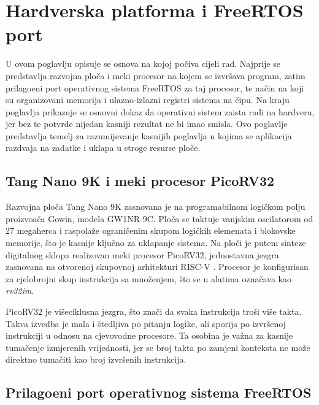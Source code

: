 \chapter{Hardverska platforma i FreeRTOS port}
\label{ch:platforma}

U ovom poglavlju opisuje se osnova na kojoj po\v{c}iva cijeli rad. Najprije se
predstavlja razvojna plo\v{c}a i meki procesor na kojem se izvr\v{s}ava program,
zatim prilago\dj{}eni port operativnog sistema FreeRTOS za taj procesor, te
na\v{c}in na koji su organizovani memorija i ulazno-izlazni registri sistema na
\v{c}ipu. Na kraju poglavlja prikazuje se osnovni dokaz da operativni sistem
zaista radi na hardveru, jer bez te potvrde nijedan kasniji rezultat ne bi imao
smisla. Ovo poglavlje predstavlja temelj za razumijevanje kasnijih poglavlja u
kojima se aplikacija razdvaja na zadatke i uklapa u stroge resurse plo\v{c}e.

\section{Tang Nano 9K i meki procesor PicoRV32}
\label{sec:platforma-hardver}

Razvojna plo\v{c}a Tang Nano 9K zasnovana je na programabilnom logi\v{c}kom polju
proizvo\dj{}a\v{c}a Gowin, modela GW1NR-9C. Plo\v{c}a se taktuje vanjskim
oscilatorom od 27 megaherca i raspola\v{z}e ograni\v{c}enim skupom logi\v{c}kih
elemenata i blokovske memorije, \v{s}to je kasnije klju\v{c}no za uklapanje
sistema. Na plo\v{c}i je putem sinteze digitalnog sklopa realizovan meki
procesor PicoRV32, jednostavna jezgra zasnovana na otvorenoj skupovnoj
arhitekturi RISC-V \citep{picorv32}. Procesor je konfigurisan za cjelobrojni
skup instrukcija sa mno\v{z}enjem, \v{s}to se u alatima ozna\v{c}ava kao
\foreignlanguage{english}{\emph{rv32im}}.

PicoRV32 je vi\v{s}eciklusna jezgra, \v{s}to zna\v{c}i da svaka instrukcija
tro\v{s}i vi\v{s}e takta. Takva izvedba je mala i \v{s}tedljiva po pitanju
logike, ali sporija po izvr\v{s}enoj instrukciji u odnosu na cjevovodne procesore.
Ta osobina je va\v{z}na za kasnije tuma\v{c}enje izmjerenih vrijednosti, jer se
broj takta po zamjeni konteksta ne mo\v{z}e direktno tuma\v{c}iti kao broj
izvr\v{s}enih instrukcija.

\section{Prilago\dj{}eni port operativnog sistema FreeRTOS}
\label{sec:platforma-port}

